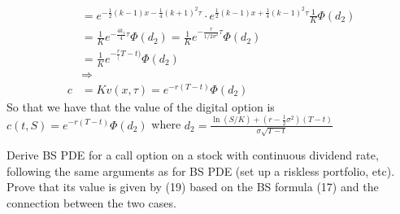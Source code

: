 \documentclass[12pt,twoside, letter]{exam}
\theoremstyle{definition}
\begin{document}
\begin{itemize}
\begin{solution}
\begin{align*}
          &= e^{-\frac{1}{2}(k-1)x-\frac{1}{4}(k+1)^2\tau}\cdot e^{\frac{1}{2}(k-1)x+\frac{1}{4}(k-1)^2\tau}\frac{1}{K}\Phi(d_2) \\
          &= \frac{1}{K}e^{-\frac{4k_1}{4}\tau}\Phi(d_2) = \frac{1}{K}e^{-\frac{r}{1/2\sigma^2}\tau}\Phi(d_2) \\
          &= \frac{1}{K}e^{-\frac{r}(T-t)}\Phi(d_2) \\
          &\Rightarrow \\
          c &= Kv(x,\tau) = e^{-r(T-t)}\Phi(d_2)
        \end{align*}
        So that we have that the value of the digital option is \\
        $c(t,S) = e^{-r(T-t)}\Phi(d_2)$ where $d_2 = \frac{\ln(S/K)+(r-\frac{1}{2}\sigma^2)(T-t)}{\sigma\sqrt{T-t}}$
      \end{solution}
  \end{itemize}


  \par{Derive BS PDE for a call option on a stock with continuous dividend rate, following the same arguments
  as for BS PDE (set up a riskless portfolio, etc). Prove that its value is given by (19) based on the BS formula (17)
  and the connection between the two cases.}
\end{document}
